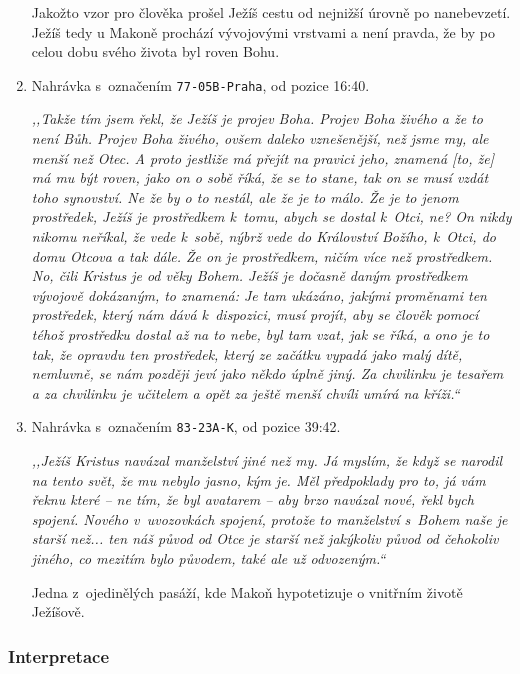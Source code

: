 \begin{enumerate}
{Jakožto vzor pro člověka prošel Ježíš cestu od nejnižší úrovně po nanebevzetí.
        Ježíš tedy u Makoně prochází vývojovými vrstvami a není pravda, že by po
        celou dobu svého života byl roven Bohu.

}

\item{
Nahrávka s~označením \texttt{77-05B-Praha}, od pozice 16:40.

\textit{%
,,Takže tím jsem řekl, že Ježíš je projev Boha. Projev Boha živého a že to
není Bůh. Projev Boha živého, ovšem daleko vznešenější, než jsme my, ale menší
než Otec. A proto jestliže má přejít na pravici jeho, znamená [to, že] má mu být
roven, jako on o sobě říká, že se to stane, tak on se musí vzdát toho synovství.
Ne že by o to nestál, ale že je to
málo. Že je to jenom prostředek, Ježíš je prostředkem k~tomu, abych se dostal
k~Otci, ne? On nikdy
nikomu neříkal, že vede k~sobě, nýbrž vede do Království Božího, k~Otci, do domu Otcova a
tak dále. Že on je prostředkem, ničím více než prostředkem. No, čili Kristus je
od věky Bohem.
Ježíš je dočasně daným prostředkem vývojově dokázaným, to znamená: Je tam
ukázáno,
jakými proměnami ten prostředek, který nám dává k~dispozici, musí projít, aby se
člověk pomocí téhož prostředku dostal až na to nebe, byl tam  vzat, jak se říká, a ono je
to tak, že opravdu ten prostředek, který ze začátku vypadá jako malý dítě,
nemluvně, se
nám později jeví jako někdo úplně jiný. Za chvilinku je tesařem a za chvilinku je
učitelem a opět za ještě menší chvíli umírá na kříži.``
}
}

\item{
Nahrávka s~označením \texttt{83-23A-K}, od pozice 39:42.

\textit{%
,,Ježíš Kristus navázal manželství jiné než my. Já myslím, že když se narodil na
tento svět, že mu nebylo jasno, kým je. Měl předpoklady pro to, já vám řeknu
které -- ne tím, že byl avatarem -- aby brzo navázal nové, řekl bych spojení.
Nového v~uvozovkách spojení, protože to manželství s~Bohem naše je starší než...
ten náš původ od Otce je starší než jakýkoliv původ od čehokoliv jiného, co
mezitím bylo původem, také ale už odvozeným.``
}

Jedna z~ojedinělých pasáží, kde Makoň hypotetizuje o vnitřním životě Ježíšově.

}

\end{enumerate}

\subsubsection*{Interpretace}

